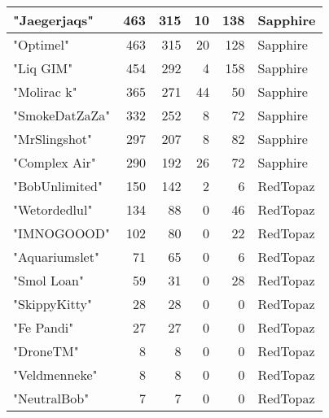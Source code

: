 \documentclass{article}
\begin{document}
\begin{table}[htbp]
\begin{tabular}{|l|r|r|r|r|l|}
"Jaegerjaqs" & 463 & 315 & 10 & 138 & Sapphire \\ \hline
"Optimel" & 463 & 315 & 20 & 128 & Sapphire \\ \hline
"Liq GIM" & 454 & 292 & 4 & 158 & Sapphire \\ \hline
"Molirac k" & 365 & 271 & 44 & 50 & Sapphire \\ \hline
"SmokeDatZaZa" & 332 & 252 & 8 & 72 & Sapphire \\ \hline
"MrSlingshot" & 297 & 207 & 8 & 82 & Sapphire \\ \hline
"Complex Air" & 290 & 192 & 26 & 72 & Sapphire \\ \hline
"BobUnlimited" & 150 & 142 & 2 & 6 & RedTopaz \\ \hline
"Wetordedlul" & 134 & 88 & 0 & 46 & RedTopaz \\ \hline
"IMNOGOOOD" & 102 & 80 & 0 & 22 & RedTopaz \\ \hline
"Aquariumslet" & 71 & 65 & 0 & 6 & RedTopaz \\ \hline
"Smol Loan" & 59 & 31 & 0 & 28 & RedTopaz \\ \hline
"SkippyKitty" & 28 & 28 & 0 & 0 & RedTopaz \\ \hline
"Fe Pandi" & 27 & 27 & 0 & 0 & RedTopaz \\ \hline
"DroneTM" & 8 & 8 & 0 & 0 & RedTopaz \\ \hline
"Veldmenneke" & 8 & 8 & 0 & 0 & RedTopaz \\ \hline
"NeutralBob" & 7 & 7 & 0 & 0 & RedTopaz \\ \hline
\end{tabular}
\end{table}
\end{document}
